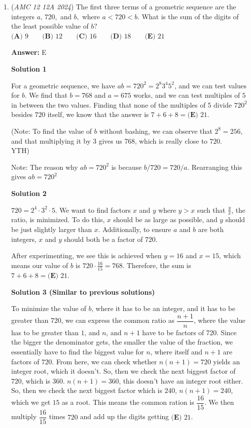 \begin{enumerate}
 


	\item (\textit{AMC 12 12A 2024}) The first three terms of a geometric sequence are the integers $a,\,720,$ and $b,$ where $a<720<b.$ What is the sum of the digits of the least possible value of $b?$
$\textbf{(A) } 9 \qquad \textbf{(B) } 12 \qquad \textbf{(C) } 16 \qquad \textbf{(D) } 18 \qquad \textbf{(E) } 21$

 \textbf{Answer: }E



\textbf{Solution 1}

For a geometric sequence, we have $ab=720^2=2^8 3^4 5^2$, and we can test values for $b$. We find that $b=768$ and $a=675$ works, and we can test multiples of $5$ in between the two values. Finding that none of the multiples of 5 divide $720^2$ besides $720$ itself, we know that the answer is $7+6+8=\boxed{\textbf{(E) } 21}$.

 (Note: To find the value of $b$ without bashing, we can observe that $2^8=256$, and that multiplying it by $3$ gives us $768$, which is really close to $720$. ~ YTH)

 Note: The reason why $ab=720^2$ is because $b/720 = 720/a$. Rearranging this gives $ab = 720^2$




\textbf{Solution 2}

$720 = 2^4 \cdot 3^2 \cdot 5$. We want to find factors $x$ and $y$ where $y>x$ such that $\frac{y}{x}$, the ratio, is minimized. To do this, $x$ should be as large as possible, and $y$ should be just slightly larger than $x$. Additionally, to ensure $a$ and $b$ are both integers, $x$ and $y$ should both be a factor of $720$.

 After experimenting, we see this is achieved when $y=16$ and $x=15$, which means our value of $b$ is $720 \cdot \frac{16}{15} = 768$. Therefore, the sum is $7+6+8=\boxed{\textbf{(E) } 21}$.

 



\textbf{Solution 3 (Similar to previous solutions)}

To minimize the value of $b$, where it has to be an integer, and it has to be greater than 720, we can express the common ratio as $\dfrac{n+1}{n}$, where the value has to be greater than $1$, and $n$, and $n+1$ have to be factors of 720. Since the bigger the denominator gets, the smaller the value of the fraction, we essentially have to find the biggest value for $n$, where itself and $n+1$ are factors of $720$. From here, we can check whether $n(n+1) = 720$ yields an integer root, which it doesn't. So, then we check the next biggest factor of $720$, which is $360$. $n(n+1) = 360$, this doesn't have an integer root either. So, then we check the next biggest factor which is $240$, $n(n+1) = 240$, which we get $15$ as a root. This means the common ration is $\dfrac{16}{15}$. We then multiply $\dfrac{16}{15}$ times $720$ and add up the digits getting $\boxed{\textbf{(E) } 21}$.


\end{enumerate}
